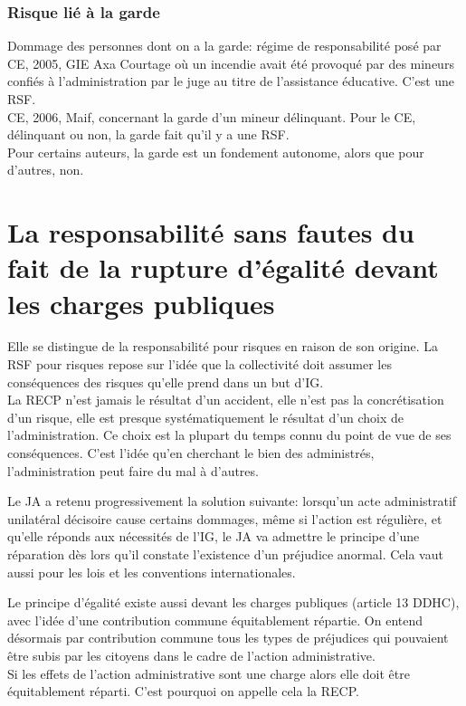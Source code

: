 \documentclass[10pt, a4paper, openany]{book}
\begin{document}
\subsection{Risque lié à la garde}

Dommage des personnes dont on a la garde: régime de responsabilité posé par CE, 2005, GIE Axa Courtage où un incendie avait été provoqué par des mineurs confiés à l'administration par le juge au titre de l'assistance éducative. C'est une RSF. \\
CE, 2006, Maif, concernant la garde d'un mineur délinquant. Pour le CE, délinquant ou non, la garde fait qu'il y a une RSF. \\
Pour certains auteurs, la garde est un fondement autonome, alors que pour d'autres, non.

\chapter{La responsabilité sans fautes du fait de la rupture d'égalité devant les charges publiques}

Elle se distingue de la responsabilité pour risques en raison de son origine. La RSF pour risques repose sur l'idée que la collectivité doit assumer les conséquences des risques qu'elle prend dans un but d'IG. \\
La RECP n'est jamais le résultat d'un accident, elle n'est pas la concrétisation d'un risque, elle est presque systématiquement le résultat d'un choix de l'administration. Ce choix est la plupart du temps connu du point de vue de ses conséquences. C'est l'idée qu'en cherchant le bien des administrés, l'administration peut faire du mal à d'autres. 


Le JA a retenu progressivement la solution suivante: lorsqu'un acte administratif unilatéral décisoire cause certains dommages, même si l'action est régulière, et qu'elle réponds aux nécessités de l'IG, le JA va admettre le principe d'une réparation dès lors qu'il constate l'existence d'un préjudice anormal. Cela vaut aussi pour les lois et les conventions internationales. 


Le principe d'égalité existe aussi devant les charges publiques (article 13 DDHC), avec l'idée d'une contribution commune équitablement répartie. On entend désormais par contribution commune tous les types de préjudices qui pouvaient être subis par les citoyens dans le cadre de l'action administrative. \\
Si les effets de l'action administrative sont une charge alors elle doit être équitablement réparti. C'est pourquoi on appelle cela la RECP.  
\end{document}
